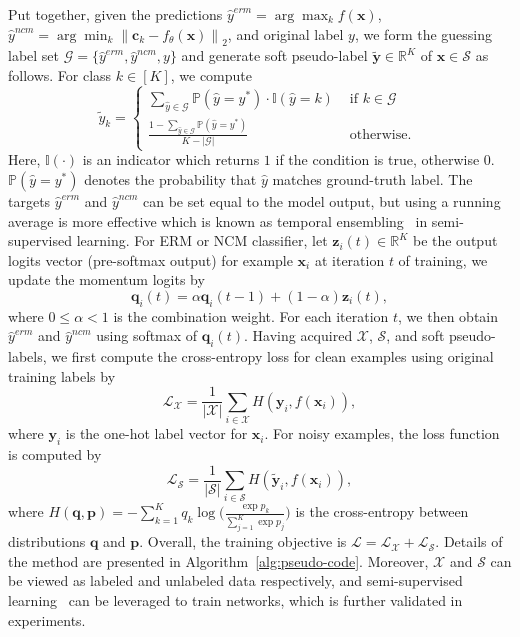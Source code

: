 \documentclass{article}
\def\c{{\boldsymbol c}}
\def\x{{\boldsymbol x}}
\def\y{{\boldsymbol y}}
\def\LL{{\mathcal L}}
\def\SS{{\mathcal S}}
\def\XX{{\mathcal X}}
\begin{document}
Put together, given the predictions $\hat{y}^{erm} = \arg \max_k f(\x)$, $\hat{y}^{ncm} = \arg \min_k \left\|\c_k - f_{\theta}(\x) \right\|_2$, and original label $y$, we form the guessing label set $\mathcal{G} = \{\hat{y}^{erm}, \hat{y}^{ncm}, y\}$ and generate soft pseudo-label $\tilde{\y} \in \mathbb{R}^{K}$ of $\x \in \SS$ as follows. For class $k \in [K]$, we compute
\begin{equation}\label{equ:soft-label}
\tilde{y}_{k} = \left\{\begin{array}{ll}
\sum_{\hat{y} \in \mathcal{G}} \mathbb{P}(\hat{y} = y^*) \cdot \mathbb{I}(\hat{y} = k) & \text { if } k \in \mathcal{G} \\[0.2cm]
\frac{1-\sum_{\hat{y} \in \mathcal{G}} \mathbb{P}(\hat{y} = y^*)}{K-|\mathcal{G}|} & \text { otherwise. }
\end{array}\right.
\end{equation}
Here, $\mathbb{I}(\cdot)$ is an indicator which returns $1$ if the condition is true, otherwise $0$. $\mathbb{P}(\hat{y} = y^*)$ denotes the probability that $\hat{y}$ matches ground-truth label.
The targets $\hat{y}^{erm}$ and $\hat{y}^{ncm}$ can be set equal to the model output, but using a running average is more effective which is known as temporal ensembling~\cite{laine2016temporal} in semi-supervised learning. For ERM or NCM classifier, let $\boldsymbol{z}_i(t) \in \mathbb{R}^{K}$ be the output logits vector (pre-softmax output) for example $\x_i$ at iteration $t$ of training, we update the momentum logits by
\begin{equation}
\boldsymbol q_{i}(t)=\alpha \boldsymbol q_{i}(t-1)+(1-\alpha) \boldsymbol{z}_{i}(t),
\end{equation}
where $0 \leq \alpha < 1$ is the combination weight. For each iteration $t$, we then obtain $\hat{y}^{erm}$ and $\hat{y}^{ncm}$ using softmax of $\boldsymbol q_{i}(t)$. Having acquired $\XX$, $\SS$, and soft pseudo-labels, we first compute the cross-entropy loss for clean examples using original training labels by
\begin{equation}
    \LL_{\XX} = \frac{1}{|\XX|} \sum_{i \in \XX} H (\y_i, f(\x_i)),
\end{equation}
where $\y_i$ is the one-hot label vector for $\x_i$. For noisy examples, the loss function is computed by
\begin{equation}
    \LL_{\SS} = \frac{1}{|\SS|} \sum_{i \in \SS} H (\tilde{\y}_i, f(\x_i)),
\end{equation}
where $H(\boldsymbol{q}, \boldsymbol{p}) = -\sum^{K}_{k=1} q_k \log \big( \frac{\exp p_k}{ \sum_{j=1}^{K} \exp p_j } \big) $ is the cross-entropy between distributions $\boldsymbol{q}$ and $\boldsymbol{p}$. Overall, the training objective is $\LL = \LL_{\XX} + \LL_{\SS}$. Details of the method are presented in Algorithm~\ref{alg:pseudo-code}. Moreover, $\XX$ and $\SS$ can be viewed as labeled and unlabeled data respectively, and semi-supervised learning~\cite{berthelot2019mixmatch,li2020dividemix} can be leveraged to train networks, which is further validated in experiments.
\end{document}
